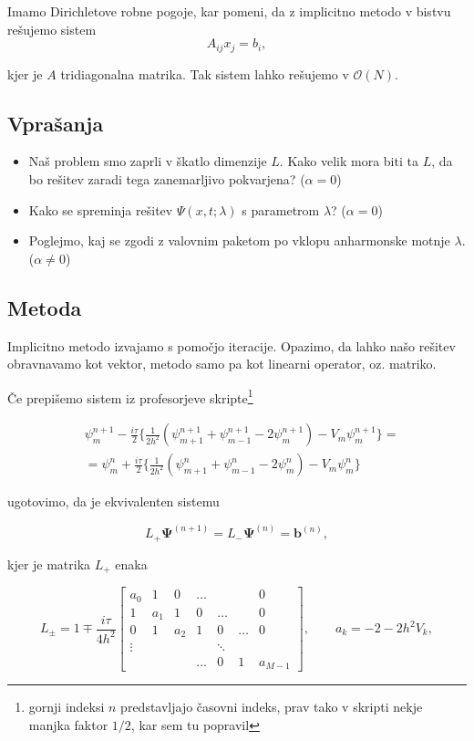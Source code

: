 \documentclass[a4 paper, 12pt]{article}
\begin{document}
Imamo Dirichletove robne pogoje, kar pomeni, da z implicitno metodo v bistvu rešujemo sistem
\[
	A_{ij}x_j = b_i,
\]

kjer je $A$ tridiagonalna matrika. Tak sistem lahko rešujemo v $\mathcal{O}(N)$.

\subsection{Vprašanja}
\begin{itemize}
	\item{Naš problem smo zaprli v škatlo dimenzije $L$. Kako velik mora biti ta $L$,
		da bo rešitev zaradi tega zanemarljivo pokvarjena? ($\alpha = 0$)}
	\item{Kako se spreminja rešitev $\Psi (x,t; \lambda)$ s parametrom $\lambda$?
		($\alpha = 0$)}
	\item{Poglejmo, kaj se zgodi z valovnim paketom po vklopu anharmonske motnje $\lambda$.
		($\alpha \neq 0$)}
\end{itemize}

\subsection{Metoda}

Implicitno metodo izvajamo s pomočjo iteracije. Opazimo, da lahko našo rešitev obravnavamo
kot vektor, metodo samo pa kot linearni operator, oz. matriko.

Če prepišemo sistem iz profesorjeve skripte\footnote{gornji indeksi $n$ predstavljajo časovni
indeks, prav tako v skripti nekje manjka faktor $1/2$, kar sem tu popravil}

\begin{align*}
	&\psi_m^{n+1} - \frac{i\tau}{2}\bigg\{\frac{1}{2h^2}\left(\psi_{m+1}^{n+1} +
		\psi_{m-1}^{n+1} - 2\psi_m^{n+1}\right) - V_m\psi_m^{n+1}\bigg\} = \\
		&= \psi_m^n + \frac{i\tau}{2}\bigg\{\frac{1}{2h^2}\left(\psi_{m+1}^n +
		\psi_{m-1}^n - 2\psi_m^n\right) - V_m\psi_m^n\bigg\}
\end{align*}

ugotovimo, da je ekvivalenten sistemu

\begin{equation}
	L_+ \mathbf{\Psi}^{(n+1)} = L_- \mathbf{\Psi}^{(n)} = \mathbf{b}^{(n)},
\end{equation}

kjer je matrika $L_+$ enaka

\begin{equation}
	L_\pm = 1 \mp \frac{i\tau}{4h^2}\begin{bmatrix}
		a_0 & 1 & 0 & \ldots & & & 0\\
		1 & a_1 & 1 & 0 & \ldots & & 0\\
		0 & 1 & a_2 & 1 & 0 & \ldots & 0\\
		\vdots & & & & \ddots \\
		& & & \ldots & 0 & 1 & a_{M-1} \end{bmatrix}, \qquad
	a_k = -2 - 2h^2V_k,
\end{equation}
\end{document}
